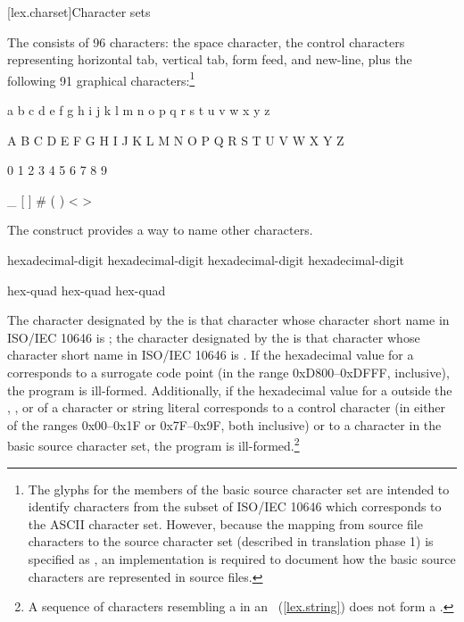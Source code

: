 [lex.charset]{Character sets}

\pnum
{}%
%
The  consists of 96 characters: the space character,
the control characters representing horizontal tab, vertical tab, form feed, and
new-line, plus the following 91 graphical characters:\footnote{The glyphs for
the members of the basic source character set are intended to
identify characters from the subset of ISO/IEC 10646 which corresponds to the ASCII
character set. However, because the mapping from source file characters to the source
character set (described in translation phase 1) is specified as
,
an implementation is required to document how the basic source characters are
represented in source files.}

\begin{codeblock}
a b c d e f g h i j k l m n o p q r s t u v w x y z

A B C D E F G H I J K L M N O P Q R S T U V W X Y Z

0 1 2 3 4 5 6 7 8 9

_ { } [ ] # ( ) < > %
\end{codeblock}

\pnum
The  construct provides a way to name
other characters.

\begin{bnf}
\br
    hexadecimal-digit hexadecimal-digit hexadecimal-digit hexadecimal-digit
\end{bnf}

\begin{bnf}
\br
     hex-quad\br
     hex-quad hex-quad
\end{bnf}

The character designated by the   is that character whose character short name in ISO/IEC 10646 is
; the character designated by the 
 is that character whose character short name in
ISO/IEC 10646 is . If the hexadecimal value for a
 corresponds to a surrogate code point (in the
range 0xD800--0xDFFF, inclusive), the program is ill-formed. Additionally, if
the hexadecimal value for a  outside
the , , or
 of
a character or
string literal corresponds to a control character (in either of the
ranges 0x00--0x1F or 0x7F--0x9F, both inclusive) or to a character in the basic
source character set, the program is ill-formed.\footnote{A sequence of characters resembling a  in an
~(\ref{lex.string}) does not form a
.}

